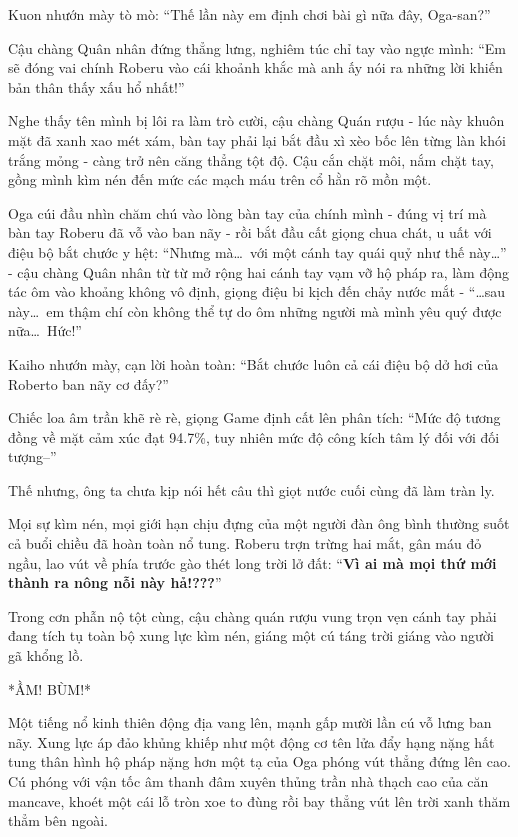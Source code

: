 \documentclass[../main.tex]{subfiles}
\begin{document}
Kuon nhướn mày tò mò: ``Thế lần này em định chơi bài gì nữa đây, Oga-san?''

Cậu chàng Quân nhân đứng thẳng lưng, nghiêm túc chỉ tay vào ngực mình: ``Em sẽ đóng vai chính Roberu vào cái khoảnh khắc mà anh ấy nói ra những lời khiến bản thân thấy xấu hổ nhất!''

Nghe thấy tên mình bị lôi ra làm trò cười, cậu chàng Quán rượu - lúc này khuôn mặt đã xanh xao mét xám, bàn tay phải lại bắt đầu xì xèo bốc lên từng làn khói trắng mỏng - càng trở nên căng thẳng tột độ. Cậu cắn chặt môi, nắm chặt tay, gồng mình kìm nén đến mức các mạch máu trên cổ hằn rõ mồn một.

Oga cúi đầu nhìn chăm chú vào lòng bàn tay của chính mình - đúng vị trí mà bàn tay Roberu đã vỗ vào ban nãy - rồi bắt đầu cất giọng chua chát, u uất với điệu bộ bắt chước y hệt: ``Nhưng mà\dots\ với một cánh tay quái quỷ như thế này\dots'' - cậu chàng Quân nhân từ từ mở rộng hai cánh tay vạm vỡ hộ pháp ra, làm động tác ôm vào khoảng không vô định, giọng điệu bi kịch đến chảy nước mắt - ``\dots sau này\dots\ em thậm chí còn không thể tự do ôm những người mà mình yêu quý được nữa\dots\ Hức!''


Kaiho nhướn mày, cạn lời hoàn toàn: ``Bắt chước luôn cả cái điệu bộ dở hơi của Roberto ban nãy cơ đấy?''

Chiếc loa âm trần khẽ rè rè, giọng Game định cất lên phân tích: ``Mức độ tương đồng về mặt cảm xúc đạt 94.7\%, tuy nhiên mức độ công kích tâm lý đối với đối tượng--''

Thế nhưng, ông ta chưa kịp nói hết câu thì giọt nước cuối cùng đã làm tràn ly.

Mọi sự kìm nén, mọi giới hạn chịu đựng của một người đàn ông bình thường suốt cả buổi chiều đã hoàn toàn nổ tung. Roberu trợn trừng hai mắt, gân máu đỏ ngầu, lao vút về phía trước gào thét long trời lở đất: ``\textbf{Vì ai mà mọi thứ mới thành ra nông nỗi này hả!???}''

Trong cơn phẫn nộ tột cùng, cậu chàng quán rượu vung trọn vẹn cánh tay phải đang tích tụ toàn bộ xung lực kìm nén, giáng một cú táng trời giáng vào người gã khổng lồ.

*ẦM! BÙM!*

Một tiếng nổ kinh thiên động địa vang lên, mạnh gấp mười lần cú vỗ lưng ban nãy. Xung lực áp đảo khủng khiếp như một động cơ tên lửa đẩy hạng nặng hất tung thân hình hộ pháp nặng hơn một tạ của Oga phóng vút thẳng đứng lên cao. Cú phóng với vận tốc âm thanh đâm xuyên thủng trần nhà thạch cao của căn mancave, khoét một cái lỗ tròn xoe to đùng rồi bay thẳng vút lên trời xanh thăm thẳm bên ngoài.
\end{document}

